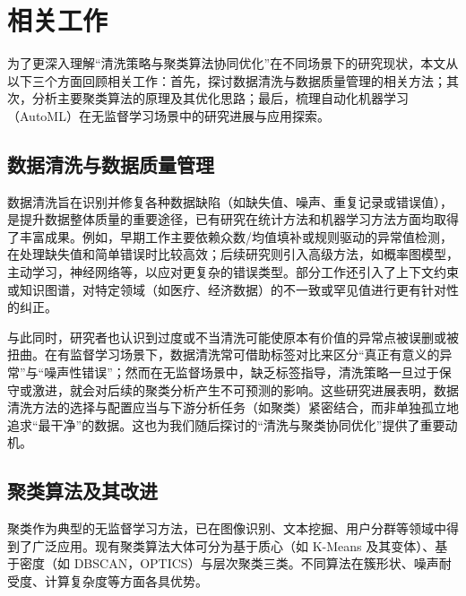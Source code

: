 \documentclass[10pt]{article} %
\numberwithin{equation}{section}
\begin{document}

\section{相关工作}\label{sec:related_work}

为了更深入理解“清洗策略与聚类算法协同优化”在不同场景下的研究现状，本文从以下三个方面回顾相关工作：首先，探讨数据清洗与数据质量管理的相关方法；其次，分析主要聚类算法的原理及其优化思路；最后，梳理自动化机器学习（AutoML）在无监督学习场景中的研究进展与应用探索。

\subsection{数据清洗与数据质量管理}
数据清洗旨在识别并修复各种数据缺陷（如缺失值、噪声、重复记录或错误值），是提升数据整体质量的重要途径，已有研究在统计方法和机器学习方法方面均取得了丰富成果。例如，早期工作主要依赖众数/均值填补\cite{10.1093/bioinformatics/btr597}或规则驱动的异常值检测\cite{6544854, 5767833}，在处理缺失值和简单错误时比较高效；后续研究则引入高级方法，如概率图模型\cite{9151362}，主动学习\cite{10.14778/2994509.2994514, 10.1145/3357384.3358129}，神经网络\cite{Krishnan2017}等，以应对更复杂的错误类型。部分工作还引入了上下文约束或知识图谱\cite{6544847,10.14778/3407790.3407801}，对特定领域（如医疗、经济数据）的不一致或罕见值进行更有针对性的纠正。

与此同时，研究者也认识到过度或不当清洗可能使原本有价值的异常点被误删或被扭曲\cite{Ni2023}。在有监督学习场景下，数据清洗常可借助标签对比来区分“真正有意义的异常”与“噪声性错误”\cite{Bernhardt2022}；然而在无监督场景中，缺乏标签指导，清洗策略一旦过于保守或激进，就会对后续的聚类分析产生不可预测的影响。这些研究进展表明，数据清洗方法的选择与配置应当与下游分析任务（如聚类）紧密结合，而非单独孤立地追求“最干净”的数据\cite{Hu2017}。这也为我们随后探讨的“清洗与聚类协同优化”提供了重要动机。

\subsection{聚类算法及其改进}
聚类作为典型的无监督学习方法，已在图像识别、文本挖掘、用户分群等领域中得到了广泛应用。现有聚类算法大体可分为基于质心（如 K-Means 及其变体\cite{Bandyapadhyay2024, HUANG2021107996, IKOTUN2023178}）、基于密度（如 DBSCAN\cite{Abdulhameed2024, CHENG2024120731}，OPTICS\cite{HAJIHOSSEINLOU2024126094, 10.3233/IDA-205497, KAMIL20232625}）与层次聚类\cite{CHEN2025125714}三类。不同算法在簇形状、噪声耐受度、计算复杂度等方面各具优势\cite{SINGH2024102799}。
\end{document}
